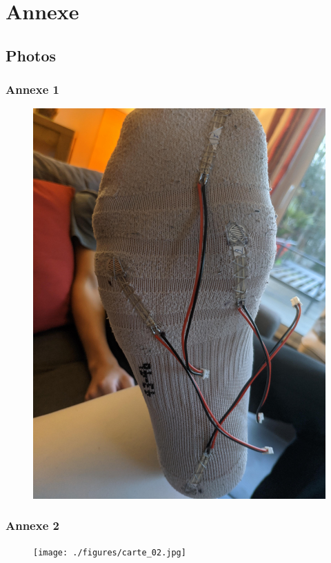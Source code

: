 \section{Annexe}
\subsection{Photos}
\begin{frame}
    \frametitle{Annexe 1}
    \begin{figure}
        \includegraphics[scale=0.05]{./figures/chau_02.jpg}
    \end{figure}
\end{frame}
\begin{frame}
    \frametitle{Annexe 2}
    \begin{figure}
        \texttt{[image: ./figures/carte\_02.jpg]}
    \end{figure}
\end{frame}
